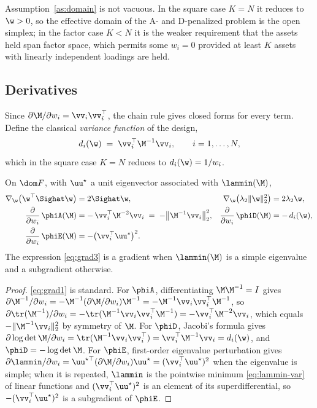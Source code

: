 \begin{remark}
Assumption~\ref{as:domain} is not vacuous. In the square case $K=N$ it reduces to
$\w>0$, so the effective domain of the A- and D-penalized problem is the open
simplex; in the factor case $K<N$ it is the weaker requirement that the assets
held span factor space, which permits some $w_i=0$ provided at least $K$ assets
with linearly independent loadings are held.
\end{remark}

\subsection{Derivatives}
\label{sec:gradients}

Since $\partial\M/\partial w_i=\vv_i\vv_i^\top$, the chain rule gives closed forms
for every term. Define the classical \emph{variance function} of the design,
\begin{equation}
  d_i(\w)\;=\;\vv_i^\top \M^{-1}\vv_i,\qquad i=1,\dots,N ,
  \label{eq:varfun}
\end{equation}
which in the square case $K=N$ reduces to $d_i(\w)=1/w_i$.

\begin{lemma}[Gradients]
\label{lem:gradients}
On $\dom F$, with $\uu^\star$ a unit eigenvector associated with $\lammin(\M)$,
\begin{align}
  \nabla_{\w}\big(\w^\top\Sighat\w\big) &= 2\Sighat\w, &
  \nabla_{\w}\big(\lambda_2\lVert\w\rVert_2^2\big) &= 2\lambda_2\w,
  \label{eq:grad1}\\
  \frac{\partial}{\partial w_i}\,\phiA(\M) &= -\,\vv_i^\top \M^{-2}\vv_i
  \;=\;-\big\lVert \M^{-1}\vv_i\big\rVert_2^{2}, &
  \frac{\partial}{\partial w_i}\,\phiD(\M) &= -\,d_i(\w),
  \label{eq:grad2}\\
  \frac{\partial}{\partial w_i}\,\phiE(\M) &= -\big(\vv_i^\top\uu^\star\big)^{2}.
  & &
  \label{eq:grad3}
\end{align}
The expression \eqref{eq:grad3} is a gradient when $\lammin(\M)$ is a simple
eigenvalue and a subgradient otherwise.
\end{lemma}

\begin{proof}
\eqref{eq:grad1} is standard. For $\phiA$, differentiating
$\M\M^{-1}=I$ gives $\partial\M^{-1}/\partial w_i=-\M^{-1}(\partial\M/\partial w_i)\M^{-1}
=-\M^{-1}\vv_i\vv_i^\top\M^{-1}$, so
$\partial\tr(\M^{-1})/\partial w_i=-\tr(\M^{-1}\vv_i\vv_i^\top\M^{-1})
=-\vv_i^\top\M^{-2}\vv_i$, which equals $-\lVert\M^{-1}\vv_i\rVert_2^2$ by
symmetry of $\M$. For $\phiD$, Jacobi's formula gives
$\partial\log\det\M/\partial w_i=\tr(\M^{-1}\vv_i\vv_i^\top)=\vv_i^\top\M^{-1}\vv_i
=d_i(\w)$, and $\phiD=-\log\det\M$. For $\phiE$, first-order eigenvalue
perturbation gives
$\partial\lammin/\partial w_i=\uu^{\star\top}(\partial\M/\partial w_i)\uu^\star
=(\vv_i^\top\uu^\star)^2$ when the eigenvalue is simple; when it is repeated,
$\lammin$ is the pointwise minimum \eqref{eq:lammin-var} of linear functions and
$(\vv_i^\top\uu^\star)^2$ is an element of its superdifferential, so
$-(\vv_i^\top\uu^\star)^2$ is a subgradient of $\phiE$.
\end{proof}

